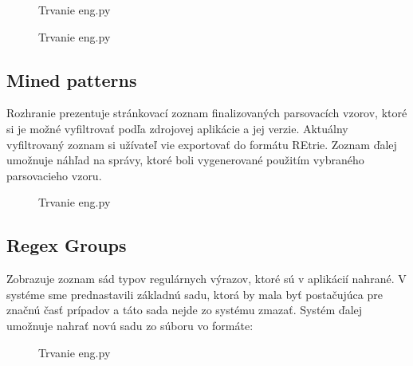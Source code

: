 \begin{figure}[htbp]
 \centering 
 \begin{minipage}{0.95\linewidth}
 	\centering
 \end{minipage}
  \caption{Trvanie eng.py }
  \label{fig:eng-duration}
\end{figure}

\begin{figure}[htbp]
 \centering 
 \begin{minipage}{0.95\linewidth}
 	\centering
 \end{minipage}
  \caption{Trvanie eng.py }
  \label{fig:eng-duration}
\end{figure}

\subsection{Mined patterns}
Rozhranie prezentuje stránkovací zoznam finalizovaných parsovacích vzorov, ktoré si je možné vyfiltrovať podľa zdrojovej aplikácie a jej verzie. Aktuálny vyfiltrovaný zoznam si užívateľ vie exportovať do formátu REtrie. Zoznam ďalej umožnuje náhľad na správy, ktoré boli vygenerované použitím vybraného parsovacieho vzoru. 

\begin{figure}[htbp]
 \centering 
 \begin{minipage}{0.95\linewidth}
 	\centering
 \end{minipage}
  \caption{Trvanie eng.py }
  \label{fig:eng-duration}
\end{figure}

\subsection{Regex Groups}
Zobrazuje zoznam sád typov regulárnych výrazov, ktoré sú v aplikácií nahrané. V systéme sme prednastavili základnú sadu, ktorá by mala byť postačujúca pre značnú časť prípadov a táto sada nejde zo systému zmazať. Systém ďalej umožnuje nahrať novú sadu zo súboru vo formáte:

 \begin{figure}[htbp]
 \centering 
 \begin{minipage}{0.95\linewidth}
 	\centering
 \end{minipage}
  \caption{Trvanie eng.py }
  \label{fig:eng-duration}
\end{figure}

